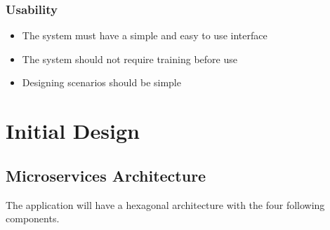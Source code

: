 \documentclass[a4paper,12pt]{article}
\begin{document}
\subsubsection{Usability}
	\begin{itemize}
		\item The system must have a simple and easy to use interface
		\item The system should not require training before use
		\item Designing scenarios should be simple
	\end{itemize}







%
%



\newpage
\section{Initial Design}  %

\subsection{Microservices Architecture}
The application will have a hexagonal architecture with the four following components.
\end{document}
